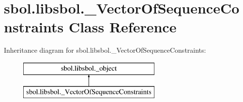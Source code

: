 \hypertarget{classsbol_1_1libsbol_1_1___vector_of_sequence_constraints}{}\section{sbol.\+libsbol.\+\_\+\+Vector\+Of\+Sequence\+Constraints Class Reference}
\label{classsbol_1_1libsbol_1_1___vector_of_sequence_constraints}
Inheritance diagram for sbol.\+libsbol.\+\_\+\+Vector\+Of\+Sequence\+Constraints\+:\begin{figure}[H]
\begin{center}
\leavevmode
\includegraphics[height=2.000000cm]{classsbol_1_1libsbol_1_1___vector_of_sequence_constraints}
\end{center}
\end{figure}

